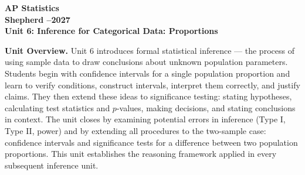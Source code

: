 \documentclass[10pt]{article}
\begin{document}
\vspace{-1.3in}

\begin{center}
  {\color{white}\bfseries\fontsize{28}{34}\selectfont AP Statistics}\\[8pt]
  {\color{goldacc}\bfseries\Large Shepherd --2027}\\[14pt]
  {\color{white}\bfseries\LARGE Unit 6: Inference for Categorical Data: Proportions}\\[4pt]
\end{center}

\vspace{0.30in}

\begin{tcolorbox}[colback=sky,colframe=navy,boxrule=0.9pt,arc=2mm,
    left=4mm,right=4mm,top=3mm,bottom=3mm]
  \textbf{Unit Overview.}\quad
  Unit 6 introduces formal statistical inference --- the process of using sample data to draw
  conclusions about unknown population parameters. Students begin with confidence intervals for
  a single population proportion and learn to verify conditions, construct intervals, interpret
  them correctly, and justify claims. They then extend these ideas to significance testing:
  stating hypotheses, calculating test statistics and $p$-values, making decisions, and stating
  conclusions in context. The unit closes by examining potential errors in inference (Type I,
  Type II, power) and by extending all procedures to the two-sample case: confidence intervals
  and significance tests for a difference between two population proportions. This unit establishes
  the reasoning framework applied in every subsequent inference unit.
\end{tcolorbox}

\vspace{0.22in}
\end{document}
